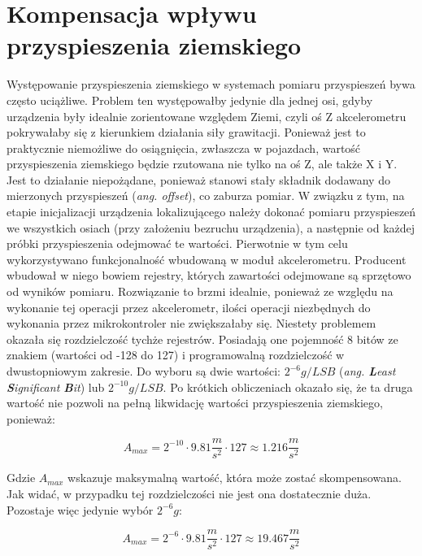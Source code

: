 \section{Kompensacja wpływu przyspieszenia ziemskiego}

Występowanie przyspieszenia ziemskiego w systemach pomiaru przyspieszeń bywa często uciążliwe. Problem ten występowałby jedynie dla jednej osi, gdyby urządzenia były idealnie zorientowane względem Ziemi, czyli oś Z akcelerometru pokrywałaby się z kierunkiem działania siły grawitacji. Ponieważ jest to praktycznie niemożliwe do osiągnięcia, zwłaszcza w pojazdach, wartość przyspieszenia ziemskiego będzie rzutowana nie tylko na oś Z, ale także X i Y. Jest to działanie niepożądane, ponieważ stanowi stały składnik dodawany do mierzonych przyspieszeń (\textit{ang. offset}), co zaburza pomiar. W związku z tym, na etapie inicjalizacji urządzenia lokalizującego należy dokonać pomiaru przyspieszeń we wszystkich osiach (przy założeniu bezruchu urządzenia), a następnie od każdej próbki przyspieszenia odejmować te wartości.
Pierwotnie w tym celu wykorzystywano funkcjonalność wbudowaną w moduł akcelerometru. Producent wbudował w niego bowiem rejestry, których zawartości odejmowane są sprzętowo od wyników pomiaru. Rozwiązanie to brzmi idealnie, ponieważ ze względu na wykonanie tej operacji przez akcelerometr, ilości operacji niezbędnych do wykonania przez mikrokontroler nie zwiększałaby się. Niestety problemem okazała się rozdzielczość tychże rejestrów. Posiadają one pojemność 8 bitów ze znakiem (wartości od -128 do 127) i programowalną rozdzielczość w dwustopniowym zakresie. Do wyboru są dwie wartości: $2^{-6}g/LSB$ (\textit{ang. \textbf{L}east \textbf{S}ignificant \textbf{B}it}) lub $2^{-10}g/LSB$. 
Po krótkich obliczeniach okazało się, że ta druga wartość nie pozwoli na pełną likwidację wartości przyspieszenia ziemskiego, ponieważ:

\begin{equation}
A_{max} = 2^{-10} \cdot 9.81\frac{m}{s^2} \cdot 127 \approx 1.216 \frac{m}{s^2}
\end{equation}

Gdzie $A_{max}$ wskazuje maksymalną wartość, która może zostać skompensowana. Jak widać, w przypadku tej rozdzielczości nie jest ona dostatecznie duża. Pozostaje więc jedynie wybór $2^{-6} g$:

\begin{equation}
A_{max} = 2^{-6} \cdot 9.81\frac{m}{s^2} \cdot 127 \approx 19.467 \frac{m}{s^2}
\end{equation}


